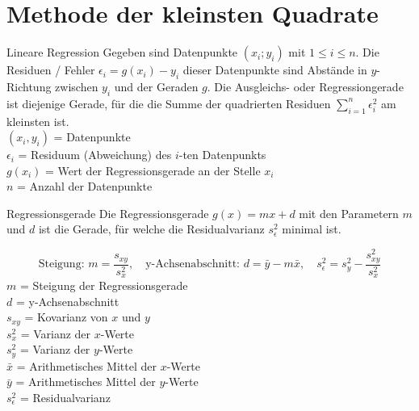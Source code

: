 \section{Methode der kleinsten Quadrate}
\begin{definition}{Lineare Regression}
Gegeben sind Datenpunkte $(x_i; y_i)$ mit $1 \leq i \leq n$. Die Residuen / Fehler $\epsilon_i=g(x_i)-y_i$ dieser Datenpunkte sind Abstände in $y$-Richtung zwischen $y_i$ und der Geraden $g$. Die Ausgleichs- oder Regressiongerade ist diejenige Gerade, für die die Summe der quadrierten Residuen $\sum_{i=1}^{n} \epsilon_i^2$ am kleinsten ist.\\
$(x_i, y_i)$ = Datenpunkte\\
$\epsilon_i$ = Residuum (Abweichung) des $i$-ten Datenpunkts\\
$g(x_i)$ = Wert der Regressionsgerade an der Stelle $x_i$\\
$n$ = Anzahl der Datenpunkte\\
\end{definition}

\begin{theorem}{Regressionsgerade}
Die Regressionsgerade $g(x)=mx+d$ mit den Parametern $m$ und $d$ ist die Gerade, für welche die Residualvarianz $s_{\epsilon}^2$ minimal ist.

$$
\text{Steigung: } m=\frac{s_{xy}}{s_x^2}, \quad \text{y-Achsenabschnitt: } d=\bar{y}-m\bar{x}, \quad s_{\epsilon}^2=s_y^2-\frac{s_{xy}^2}{s_x^2}
$$
$m$ = Steigung der Regressionsgerade\\
$d$ = y-Achsenabschnitt\\
$s_{xy}$ = Kovarianz von $x$ und $y$\\
$s_x^2$ = Varianz der $x$-Werte\\
$s_y^2$ = Varianz der $y$-Werte\\
$\bar{x}$ = Arithmetisches Mittel der $x$-Werte\\
$\bar{y}$ = Arithmetisches Mittel der $y$-Werte\\
$s_{\epsilon}^2$ = Residualvarianz\\
\end{theorem}

